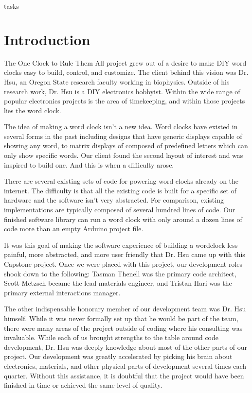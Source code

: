 tasks\documentclass[onecolumn, draftclsnofoot,10pt, compsoc]{IEEEtran}
\begin{document}
\section{Introduction}

The One Clock to Rule Them All project grew out of a desire to make DIY word clocks easy to build, control, and customize.
The client behind this vision was Dr. Hsu, an Oregon State research faculty working in biophysics. Outside of his research work, Dr. Hsu is a DIY electronics hobbyist.
Within the wide range of popular electronics projects is the area of timekeeping, and within those projects lies the word clock.

The idea of making a word clock isn’t a new idea.
Word clocks have existed in several forms in the past including designs that have generic displays capable of showing any word, to matrix displays of composed of predefined letters which can only show specific words.
Our client found the second layout of interest and was inspired to build one.
And this is when a difficulty arose.

There are several existing sets of code for powering word clocks already on the internet.
The difficulty is that all the existing code is built for a specific set of hardware and the software isn’t very abstracted.
For comparison, existing implementations are typically composed of several hundred lines of code.
Our finished software library can run a word clock with only around a dozen lines of code more than an empty Arduino project file.

It was this goal of making the software experience of building a wordclock less painful, more abstracted, and more user friendly that Dr. Hsu came up with this Capstone project.
Once we were placed with this project, our development roles shook down to the following: Tasman Thenell was the primary code architect, Scott Metzsch became the lead materials engineer, and Tristan Hari was the primary external interactions manager.

The other indispensable honorary member of our development team was Dr. Hsu himself.
While it was never formally set up that he would be part of the team, there were many areas of the project outside of coding where his consulting was invaluable.
While each of us brought strengths to the table around code development, Dr. Hsu was deeply knowledge about most of the other parts of our project.
Our development was greatly accelerated by picking his brain about electronics, materials, and other physical parts of development several times each quarter. Without this assistance, it is doubtful that the project would have been finished in time or achieved the same level of quality.
\end{document}
